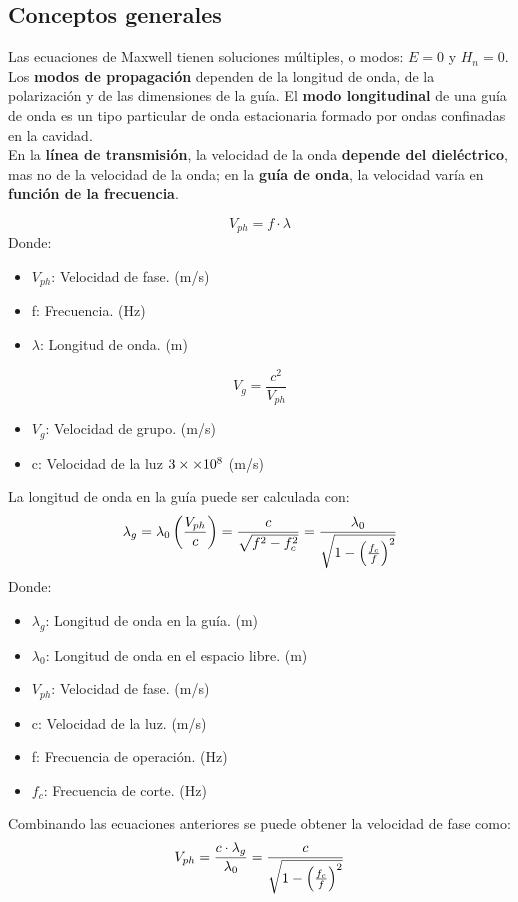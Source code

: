 \documentclass[
	12pt, %
	fleqn, %
	a4paper, %
	oneside, %
]{LegrandOrangeBook}
\begin{document}
\subsection{Conceptos generales}
Las ecuaciones de Maxwell tienen soluciones múltiples, o modos: $E=0$ y $H_n=0$. Los \textbf{modos de propagación} dependen de la longitud de onda, de la polarización y de las dimensiones de la guía. El \textbf{modo longitudinal} de una guía de onda es un tipo particular de onda estacionaria formado por ondas confinadas en la cavidad. \\
En la \textbf{línea de transmisión}, la velocidad de la onda \textbf{depende del dieléctrico}, mas no de la velocidad de la onda; en la \textbf{guía de onda}, la velocidad varía en \textbf{función de la frecuencia}.
\begin{definition}
\begin{equation}
V_{ph}=f\cdot\lambda
\label{eq:velfase}
\end{equation}
Donde:
\begin{itemize}
\item $V_{ph}$: Velocidad de fase. (m/s)
\item f: Frecuencia. (Hz)
\item $\lambda$: Longitud de onda. (m)
\end{itemize}
\end{definition}
\begin{definition}
\begin{equation}
V_g=\frac{c^2}{V_{ph}}
\label{eq:velgrup}
\end{equation}
\begin{itemize}
\item $V_g$: Velocidad de grupo. (m/s)
\item c: Velocidad de la luz $3\times\times 10^{8}$ (m/s)
\end{itemize}
La longitud de onda en la guía puede ser calculada con:
\begin{equation}
\lambda_g=\lambda_0\left(\frac{V_{ph}}{c}\right)=\frac{c}{\sqrt{f^2-f_c^2}}=\frac{\lambda_0}{\sqrt{1-\left(\frac{f_c}{f}\right)^2}}
\end{equation}
Donde:
\begin{itemize}
\item $\lambda_g$: Longitud de onda en la guía. (m)
\item $\lambda_0$: Longitud de onda en el espacio libre. (m)
\item $V_{ph}$: Velocidad de fase. (m/s)
\item c: Velocidad de la luz. (m/s)
\item f: Frecuencia de operación. (Hz)
\item $f_c$: Frecuencia de corte. (Hz)
\end{itemize}
\end{definition}
Combinando las ecuaciones anteriores se puede obtener la velocidad de fase como:
\begin{equation}
V_{ph}=\frac{c\cdot\lambda_g}{\lambda_0}=\frac{c}{\sqrt{1-\left(\frac{f_c}{f}\right)^2}}
\end{equation}
\end{document}
